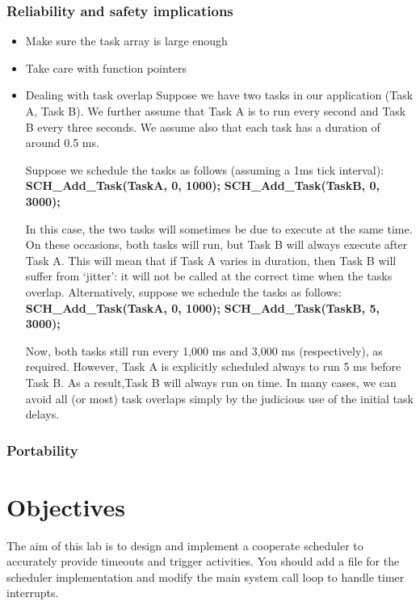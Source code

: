 \documentclass[twoside, final]{hcmut_report}
\begin{document}
\subsubsection{Reliability and safety implications}
\begin{itemize}
    \item Make sure the task array is large enough
    \item Take care with function pointers
    \item Dealing with task overlap
    \subitem Suppose we have two tasks in our application (Task A, Task B). We further assume that Task A is to run every second and Task B every three seconds. We assume also that
each task has a duration of around 0.5 ms.  

    \subitem Suppose we schedule the tasks as follows (assuming a 1ms tick interval):
        \subsubitem \textbf{SCH\_Add\_Task(TaskA, 0, 1000);}
        \subsubitem \textbf{SCH\_Add\_Task(TaskB, 0, 3000);}

\subitem In this case, the two tasks will sometimes be due to execute at the same time. On
these occasions, both tasks will run, but Task B will always execute after Task A. This will mean that if Task A varies in duration, then Task B will suffer from ‘jitter’: it will not be called at the correct time when the tasks overlap.
\subitem Alternatively, suppose we schedule the tasks as follows:
\subsubitem \textbf{SCH\_Add\_Task(TaskA, 0, 1000);}
\subsubitem \textbf{SCH\_Add\_Task(TaskB, 5, 3000);}

\subitem Now, both tasks still run every 1,000 ms and 3,000 ms (respectively), as required. However, Task A is explicitly scheduled always to run 5 ms before Task B. As a result,Task B will always run on time.
\subitem In many cases, we can avoid all (or most) task overlaps simply by the judicious use
of the initial task delays.

\end{itemize}






\subsubsection{Portability}
\section{Objectives}
The aim of this lab is to design and implement a cooperate scheduler to accurately provide timeouts and trigger activities. You should add a file for the scheduler implementation and modify the main system call loop to handle timer interrupts.
\end{document}

